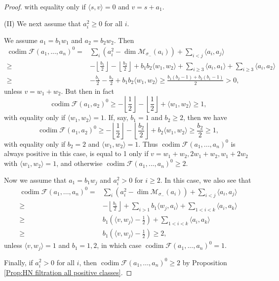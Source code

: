 \documentclass[leqno,11pt]{amsart}
\def\codim{\mathop{\mathrm{codim}}\nolimits}
\def\dim{\mathop{\mathrm{dim}}\nolimits}
\theoremstyle{definition}
\def\FF{\ensuremath{\mathcal F}}
\def\MM{\ensuremath{\mathcal M}}
\begin{document}
\begin{proof}
with equality only if $\langle s,v\rangle=0$ and $v=s+a_1$.  



(II) We next assume that $a_i^2 \geq 0$ for all $i$.
 

We assume $a_1=b_1 w_1$ and $a_2=b_2 w_2$.
Then 
 \begin{equation}\label{eq: spherical 1,1 case II,a}
\begin{split}
\codim\FF(a_1,...,a_n)^0=& \sum_i (a_i^2-\dim \MM_{\sigma_-}(a_i))+\sum_{i<j}\langle a_i,a_j \rangle\\
\geq &
-\left\lfloor\frac{b_1}{2}\right\rfloor-\left\lfloor\frac{b_2}{2}\right\rfloor+b_1 b_2 \langle w_1,w_2 \rangle
+\sum_{i \geq 3} \langle a_i,a_1\rangle+\sum_{i\geq 3}\langle a_i,a_2 \rangle\\
\geq & -\frac{b_1}{2}-\frac{b_2}{2}+b_1 b_2 \langle w_1,w_2 \rangle\geq \frac{b_1(b_2-1)+b_2(b_1-1)}{2}>0,
\end{split}
\end{equation}
unless $v=w_1+w_2$.  But then in fact $$\codim\FF(a_1,a_2)^0\geq-\left\lfloor\frac{1}{2}\right\rfloor-\left\lfloor\frac{1}{2}\right\rfloor+\langle w_1,w_2\rangle\geq 1,$$ with equality only if $\langle w_1,w_2\rangle=1$.  If, say, $b_1=1$ and $b_2\geq 2$, then we have $$\codim\FF(a_1,a_2)^0\geq-\left\lfloor\frac{1}{2}\right\rfloor-\left\lfloor\frac{b_2}{2}\right\rfloor+b_2\langle w_1,w_2\rangle\geq \frac{b_2}{2}\geq 1,$$ with equality only if $b_2=2$ and $\langle w_1,w_2\rangle=1$.  Thus $\codim\FF(a_1,...,a_n)^0$ is always positive in this case, is equal to 1 only if $v=w_1+w_2,2w_1+w_2,w_1+2w_2$ with $\langle w_1,w_2\rangle=1$, and otherwise $\codim\FF(a_1,...,a_n)^0\geq 2$.


Now we assume that $a_1=b_1 w_j$ and $a_i^2>0$ for $i \geq 2$.
In this case, we also see that
\begin{equation}
\begin{split}
\codim\FF(a_1,...,a_n)^0=&\sum_i (a_i^2-\dim \MM_{\sigma_-}(a_i))+\sum_{i<j}\langle a_i,a_j \rangle\\
\geq&-\left\lfloor\frac{b_1}{2}\right\rfloor+\sum_{i>1}b_1\langle w_j,a_i\rangle+\sum_{1<i<k}\langle a_i,a_k\rangle\\
\geq&b_1(\langle v,w_j\rangle-\frac{1}{2})+\sum_{1<i<k}\langle a_i,a_k\rangle\\
\geq&b_1(\langle v,w_j\rangle-\frac{1}{2})\geq 2,
\end{split}
\end{equation}
unless $\langle v,w_j\rangle=1$ and $b_1=1,2$, in which case $\codim\FF(a_1,...,a_n)^0=1$.  

Finally, if $a_i^2>0$ for all $i$, then $\codim\FF(a_1,...,a_n)^0\geq 2$ by Proposition \ref{Prop:HN filtration all positive classes}.
\end{proof}
\end{document}
